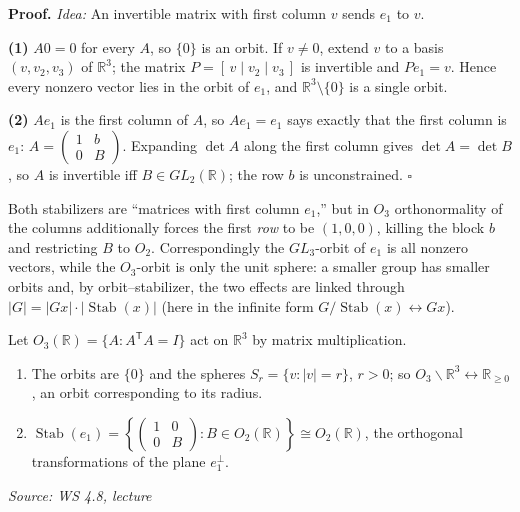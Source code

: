 \documentclass[11pt]{report}
\renewenvironment{proof}[1][Proof]{\noindent\textbf{#1.} }{\hfill$\square$\par\vspace{5pt}}
\newcommand{\srcline}[1]{\par\hfill{\footnotesize\textit{Source: #1}}}
\begin{document}
\begin{proof}
\textit{Idea:} An invertible matrix with first column $v$ sends $e_1$ to $v$.\par
\textbf{(1)} $A0 = 0$ for every $A$, so $\{0\}$ is an orbit. If $v \neq 0$, extend $v$ to a basis $(v, v_2, v_3)$ of $\mathbb{R}^3$; the matrix $P = [\,v \mid v_2 \mid v_3\,]$ is invertible and $Pe_1 = v$. Hence every nonzero vector lies in the orbit of $e_1$, and $\mathbb{R}^3 \setminus \{0\}$ is a single orbit.

\textbf{(2)} $Ae_1$ is the first column of $A$, so $Ae_1 = e_1$ says exactly that the first column is $e_1$: $A = \begin{pmatrix} 1 & b \\ 0 & B \end{pmatrix}$. Expanding $\det A$ along the first column gives $\det A = \det B$, so $A$ is invertible iff $B \in GL_2(\mathbb{R})$; the row $b$ is unconstrained.
\end{proof}

\begin{rembox}[{$GL_3$ versus $O_3$}]\label{rem:gl3-versus-o3}
Both stabilizers are ``matrices with first column $e_1$,'' but in $O_3$ orthonormality of the columns additionally forces the first \emph{row} to be $(1,0,0)$, killing the block $b$ and restricting $B$ to $O_2$. Correspondingly the $GL_3$-orbit of $e_1$ is all nonzero vectors, while the $O_3$-orbit is only the unit sphere: a smaller group has smaller orbits and, by orbit--stabilizer, the two effects are linked through $|G| = |Gx|\cdot|\operatorname{Stab}(x)|$ (here in the infinite form $G/\operatorname{Stab}(x) \leftrightarrow Gx$).
\end{rembox}

\begin{propbox}\label{prop:o3-r-acting-r3}
Let $O_3(\mathbb{R}) = \{A : A^{\mathsf{T}}A = I\}$ act on $\mathbb{R}^3$ by matrix multiplication.
\begin{enumerate}
    \item The orbits are $\{0\}$ and the spheres $S_r = \{v : |v| = r\}$, $r > 0$; so $O_3 \backslash \mathbb{R}^3 \leftrightarrow \mathbb{R}_{\geq 0}$, an orbit corresponding to its radius.
    \item $\operatorname{Stab}(e_1) = \left\{ \begin{pmatrix} 1 & 0 \\ 0 & B \end{pmatrix} : B \in O_2(\mathbb{R}) \right\} \cong O_2(\mathbb{R})$, the orthogonal transformations of the plane $e_1^\perp$.
\end{enumerate}
\srcline{WS 4.8, lecture}
\end{propbox}
\end{document}

